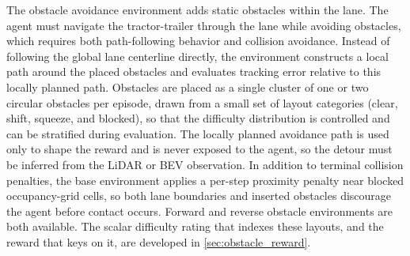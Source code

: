 The obstacle avoidance environment adds static obstacles within the lane. The agent must navigate the tractor-trailer through the lane while avoiding obstacles, which requires both path-following behavior and collision avoidance. Instead of following the global lane centerline directly, the environment constructs a local path around the placed obstacles and evaluates tracking error relative to this locally planned path. Obstacles are placed as a single cluster of one or two circular obstacles per episode, drawn from a small set of layout categories (clear, shift, squeeze, and blocked), so that the difficulty distribution is controlled and can be stratified during evaluation. The locally planned avoidance path is used only to shape the reward and is never exposed to the agent, so the detour must be inferred from the LiDAR or BEV observation. In addition to terminal collision penalties, the base environment applies a per-step proximity penalty near blocked occupancy-grid cells, so both lane boundaries and inserted obstacles discourage the agent before contact occurs. Forward and reverse obstacle environments are both available. The scalar difficulty rating that indexes these layouts, and the reward that keys on it, are developed in \cref{sec:obstacle_reward}.

